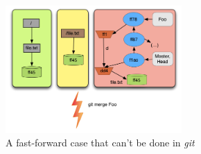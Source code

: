 \begin{figure}[!t]
   \centering
   \includegraphics[width=0.6\textwidth]{images/fast_forward_merge_pre.png}
   \caption{A fast-forward case that can't be done in
   \emph{git}}\label{fig:ffmergepre}
\end{figure}

